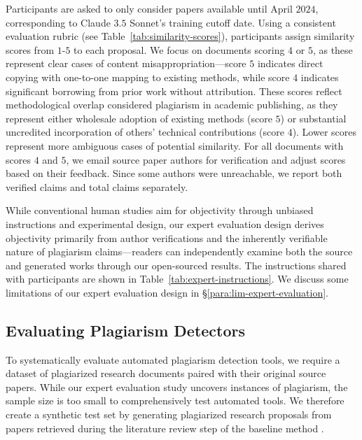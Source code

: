 Participants are asked to only 
consider papers available until April $2024$, 
corresponding to Claude $3.5$ Sonnet's training cutoff date.
Using a consistent evaluation rubric (see Table~\ref{tab:similarity-scores}), participants assign similarity scores from $1$-$5$ to each proposal. We focus on documents scoring $4$ or $5$, as these represent clear cases of content misappropriation---score $5$ indicates direct copying with one-to-one mapping to existing methods, while score $4$ indicates significant borrowing from prior work without attribution.
 These scores reflect methodological overlap considered plagiarism in academic publishing, 
 as they represent either wholesale adoption of existing methods (score $5$) 
 or substantial uncredited incorporation of others' technical contributions (score $4$). 
 Lower scores represent more ambiguous cases of potential similarity. 
 For all documents with scores $4$ and $5$, 
 we email source paper authors for verification 
 and adjust scores based on their feedback. 
 Since some authors were unreachable, we report both verified claims and total claims separately.

 While conventional human studies 
 aim for objectivity 
 through unbiased instructions 
 and experimental design, 
 our expert evaluation design 
 derives objectivity primarily 
 from author verifications and 
 the inherently verifiable nature 
 of plagiarism claims---readers 
 can independently examine both the source 
 and generated works through our open-sourced results. 
 The instructions shared with participants are shown in Table~\ref{tab:expert-instructions}. We discuss some limitations of our expert evaluation design in \S\ref{para:lim-expert-evaluation}.




\subsection{Evaluating Plagiarism Detectors}
\label{subsec:automated-plag-detection-exp}

To systematically evaluate automated plagiarism detection tools, 
we require a dataset of plagiarized research documents paired with their original source papers. 
While our expert evaluation study uncovers instances of plagiarism, 
the sample size is too small to comprehensively test automated tools. 
We therefore create a synthetic test set by 
generating plagiarized research proposals from papers 
retrieved during the literature review step of the baseline method \citep{si2024can}. 

